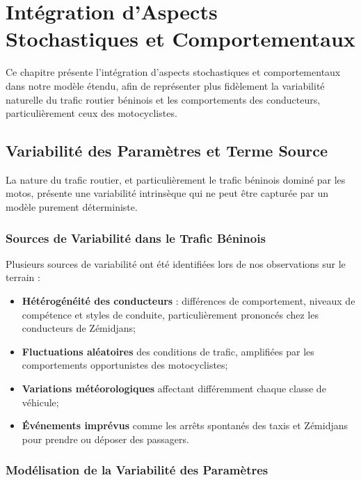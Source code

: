 \chapter{Intégration d'Aspects Stochastiques et Comportementaux}
\label{chap:aspects_stochastiques}

Ce chapitre présente l'intégration d'aspects stochastiques et comportementaux dans notre modèle étendu, afin de représenter plus fidèlement la variabilité naturelle du trafic routier béninois et les comportements des conducteurs, particulièrement ceux des motocyclistes.

\section{Variabilité des Paramètres et Terme Source}
\label{sec:variabilite}

La nature du trafic routier, et particulièrement le trafic béninois dominé par les motos, présente une variabilité intrinsèque qui ne peut être capturée par un modèle purement déterministe.

\subsection{Sources de Variabilité dans le Trafic Béninois}
\label{subsec:sources_variabilite}

Plusieurs sources de variabilité ont été identifiées lors de nos observations sur le terrain :

\begin{itemize}
\item \textbf{Hétérogénéité des conducteurs} : différences de comportement, niveaux de compétence et styles de conduite, particulièrement prononcés chez les conducteurs de Zémidjans;
\item \textbf{Fluctuations aléatoires} des conditions de trafic, amplifiées par les comportements opportunistes des motocyclistes;
\item \textbf{Variations météorologiques} affectant différemment chaque classe de véhicule;
\item \textbf{Événements imprévus} comme les arrêts spontanés des taxis et Zémidjans pour prendre ou déposer des passagers.
\end{itemize}

\subsection{Modélisation de la Variabilité des Paramètres}
\label{subsec:variabilite_parametres}

